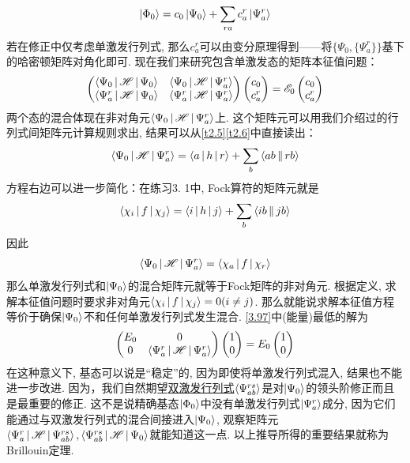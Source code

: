\begin{align}
	\Ket{\Phi_0} = c_0\Ket{\Psi_0} + \sum_{ra}c_a^r\Ket{\Psi_a^r}
\end{align}
若在修正中仅考虑单激发行列式, 
那么$c_a^r$可以由变分原理得到——将$\{\Psi_0,\{\Psi_a^r\}\}$基下的哈密顿矩阵对角化即可. 
现在我们来研究包含单激发态的矩阵本征值问题：
\begin{align}
	\label{3.97}
	\begin{pmatrix}
		\Braket{\Psi_0|\mathscr{H}|\Psi_0}   & \Braket{\Psi_0|\mathscr{H}|\Psi_a^r}   \\
		\Braket{\Psi_a^r|\mathscr{H}|\Psi_0} & \Braket{\Psi_a^r|\mathscr{H}|\Psi_a^r}
	\end{pmatrix}
	\begin{pmatrix}
		c_0\\
		c_a^r
	\end{pmatrix}
	=\mathscr{E}_0
	\begin{pmatrix}
		c_0\\
		c_a^r
	\end{pmatrix}
\end{align}
两个态的混合体现在非对角元$\Braket{\Psi_0|\mathscr{H}|\Psi_a^r}$上. 
这个矩阵元可以用我们介绍过的行列式间矩阵元计算规则求出, 
结果可以从\ref{t2.5}\ref{t2.6}中直接读出：
\begin{align}
	\Braket{\Psi_0|\mathscr{H}|\Psi_a^r} = \Braket{a|h|r} + \sum_b\Braket{ab||rb}
\end{align}
方程右边可以进一步简化：在练习3.
1中, 
Fock算符的矩阵元就是
\begin{align}
	\Braket{\chi_i|f|\chi_j} = \Braket{i|h|j} + \sum_b\Braket{ib||jb}
\end{align} 
因此
\begin{align}
	\Braket{\Psi_0|\mathscr{H}|\Psi_a^r} = \Braket{\chi_a|f|\chi_r}
\end{align}
那么单激发行列式和$\Ket{\Psi_0}$的混合矩阵元就等于Fock矩阵的非对角元.
根据定义, 
求解\hft 本征值问题时要求非对角元$\Braket{\chi_i|f|\chi_j}=0(i\neq j)$. 
那么就能说求解\hft 本征值方程等价于确保$\Ket{\Psi_0}$不和任何单激发行列式发生混合. 
\eqref{3.97}中(能量)最低的解为
\begin{align}
	\begin{pmatrix}
		E_0 & 0\\
		0   & \Braket{\Psi_a^r|\mathscr{H}|\Psi_a^r}
	\end{pmatrix}
	\begin{pmatrix}
		1\\0
	\end{pmatrix}
	=E_0
	\begin{pmatrix}
		1\\0
	\end{pmatrix}
\end{align}
在这种意义下, 
\hft 基态可以说是“稳定”的, 
因为即使将单激发行列式混入, 
结果也不能进一步改进. 
因为，我们自然期望\underline{双激发行列式}$\Braket{\Psi_{ab}^{rs}}$是对$\Ket{\Psi_0}$的领头阶修正而且是最重要的修正. 
这不是说精确基态$\Ket{\Phi_0}$中没有单激发行列式$\Ket{\Psi_a^r}$成分, 
因为它们能通过与双激发行列式的混合间接进入$\Ket{\Psi_0}$, 
观察矩阵元$\Braket{\Psi_a^r|\mathscr{H}|\Psi_{ab}^{rs}},\Braket{\Psi_{ab}^{rs}|\mathscr{H}|\Psi_0}$就能知道这一点. 
以上推导所得的重要结果就称为Brillouin定理. 


